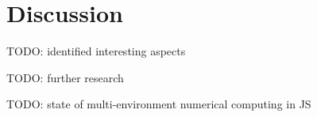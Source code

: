 \section{Discussion}\label{sec:discussion}

TODO: identified interesting aspects

TODO: further research

TODO: state of multi-environment numerical computing in JS
